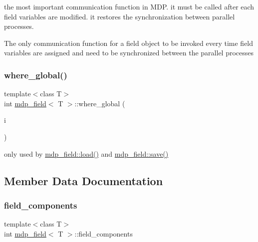 the most important communication function in M\+DP. it must be called after each field variables are modified. it restores the synchronization between parallel processes.

The only communication function for a field object to be invoked every time field variables are assigned and need to be synchronized between the parallel processes \mbox{\label{classmdp__field_ac8422b94f444285b0d34748ed6b7c06f}} 
\subsubsection{\texorpdfstring{where\+\_\+global()}{where\_global()}}
{\footnotesize\ttfamily template$<$class T$>$ \\
int \hyperlink{classmdp__field}{mdp\+\_\+field}$<$ T $>$\+::where\+\_\+global (\begin{DoxyParamCaption}\item[{\hyperlink{mdp__global__vars_8h_aaa1ad9d0dcd2124aa5af0120d9954174}{mdp\+\_\+int}}]{i }\end{DoxyParamCaption})\hspace{0.3cm}{\ttfamily [inline]}}



only used by \hyperlink{classmdp__field_a21ce8e89744a826abdc9f5325c714892}{mdp\+\_\+field\+::load()} and \hyperlink{classmdp__field_a66bbe9d66cc3ad2a5955282df3519471}{mdp\+\_\+field\+::save()} 



\subsection{Member Data Documentation}
\mbox{\label{classmdp__field_a090b0995fcfb15a9e9258b5721b685ba}} 
\subsubsection{\texorpdfstring{field\+\_\+components}{field\_components}}
{\footnotesize\ttfamily template$<$class T$>$ \\
int \hyperlink{classmdp__field}{mdp\+\_\+field}$<$ T $>$\+::field\+\_\+components\hspace{0.3cm}{\ttfamily [protected]}}

